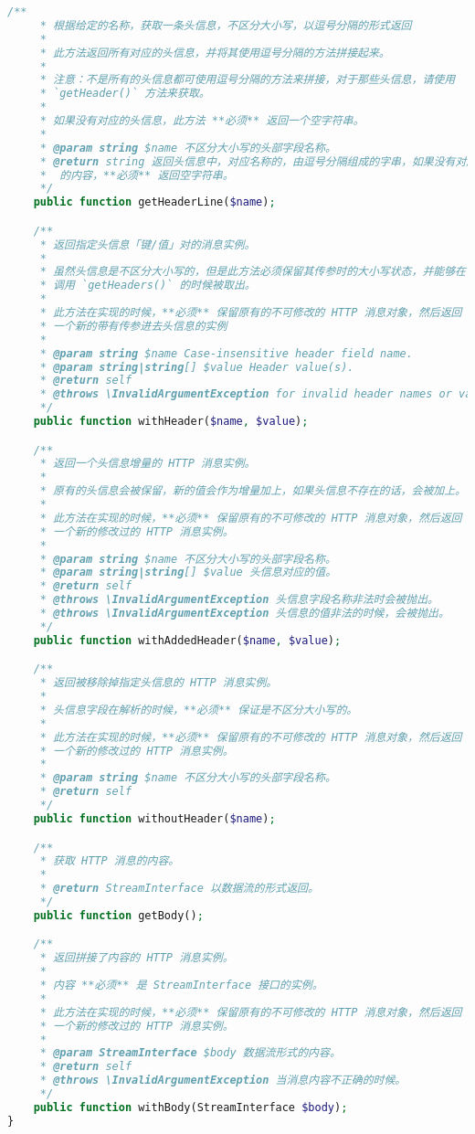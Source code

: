 \begin{lstlisting}[language=PHP]
    /**
     * 根据给定的名称，获取一条头信息，不区分大小写，以逗号分隔的形式返回
     * 
     * 此方法返回所有对应的头信息，并将其使用逗号分隔的方法拼接起来。
     *
     * 注意：不是所有的头信息都可使用逗号分隔的方法来拼接，对于那些头信息，请使用
     * `getHeader()` 方法来获取。
     * 
     * 如果没有对应的头信息，此方法 **必须** 返回一个空字符串。
     *
     * @param string $name 不区分大小写的头部字段名称。
     * @return string 返回头信息中，对应名称的，由逗号分隔组成的字串，如果没有对应
     *  的内容，**必须** 返回空字符串。
     */
    public function getHeaderLine($name);

    /**
     * 返回指定头信息「键/值」对的消息实例。
     *
     * 虽然头信息是不区分大小写的，但是此方法必须保留其传参时的大小写状态，并能够在
     * 调用 `getHeaders()` 的时候被取出。
     *
     * 此方法在实现的时候，**必须** 保留原有的不可修改的 HTTP 消息对象，然后返回
     * 一个新的带有传参进去头信息的实例
     *
     * @param string $name Case-insensitive header field name.
     * @param string|string[] $value Header value(s).
     * @return self
     * @throws \InvalidArgumentException for invalid header names or values.
     */
    public function withHeader($name, $value);

    /**
     * 返回一个头信息增量的 HTTP 消息实例。
     *
     * 原有的头信息会被保留，新的值会作为增量加上，如果头信息不存在的话，会被加上。
     *
     * 此方法在实现的时候，**必须** 保留原有的不可修改的 HTTP 消息对象，然后返回
     * 一个新的修改过的 HTTP 消息实例。
     *
     * @param string $name 不区分大小写的头部字段名称。
     * @param string|string[] $value 头信息对应的值。
     * @return self
     * @throws \InvalidArgumentException 头信息字段名称非法时会被抛出。
     * @throws \InvalidArgumentException 头信息的值非法的时候，会被抛出。
     */
    public function withAddedHeader($name, $value);

    /**
     * 返回被移除掉指定头信息的 HTTP 消息实例。
     *
     * 头信息字段在解析的时候，**必须** 保证是不区分大小写的。
     *
     * 此方法在实现的时候，**必须** 保留原有的不可修改的 HTTP 消息对象，然后返回
     * 一个新的修改过的 HTTP 消息实例。
     *
     * @param string $name 不区分大小写的头部字段名称。
     * @return self
     */
    public function withoutHeader($name);

    /**
     * 获取 HTTP 消息的内容。
     *
     * @return StreamInterface 以数据流的形式返回。
     */
    public function getBody();

    /**
     * 返回拼接了内容的 HTTP 消息实例。
     *
     * 内容 **必须** 是 StreamInterface 接口的实例。
     *
     * 此方法在实现的时候，**必须** 保留原有的不可修改的 HTTP 消息对象，然后返回
     * 一个新的修改过的 HTTP 消息实例。
     *
     * @param StreamInterface $body 数据流形式的内容。
     * @return self
     * @throws \InvalidArgumentException 当消息内容不正确的时候。
     */
    public function withBody(StreamInterface $body);
}
\end{lstlisting}

